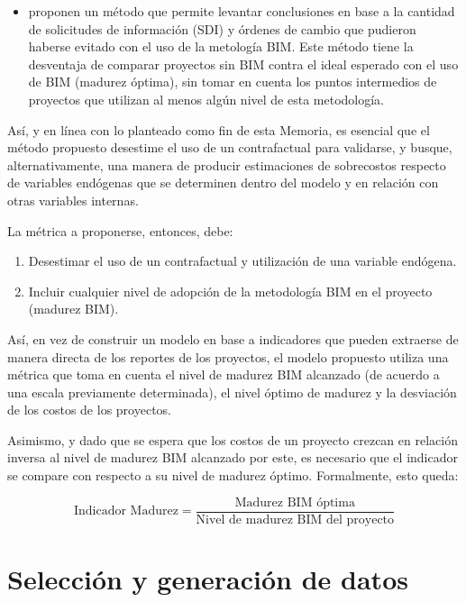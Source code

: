 \begin{itemize}
    \item {} proponen un método que permite levantar conclusiones en base a la cantidad de solicitudes de información (SDI) y órdenes de cambio que pudieron haberse evitado con el uso de la metología BIM. Este método tiene la desventaja de comparar proyectos sin BIM contra el ideal esperado con el uso de BIM (madurez óptima), sin tomar en cuenta los puntos intermedios de proyectos que utilizan al menos algún nivel de esta metodología.
\end{itemize}


Así, y en línea con lo planteado como fin de esta Memoria, es esencial que el método propuesto desestime el uso de un contrafactual para validarse, y busque, alternativamente, una manera de producir estimaciones de sobrecostos respecto de variables endógenas que se determinen dentro del modelo y en relación con otras variables internas.

La métrica a proponerse, entonces, debe:

\begin{enumerate}
    \item Desestimar el uso de un contrafactual y utilización de una variable endógena.
    \item Incluir cualquier nivel de adopción de la metodología BIM en el proyecto (madurez BIM).
\end{enumerate}

Así, en vez de construir un modelo en base a indicadores que pueden extraerse de manera directa de los reportes de los proyectos, el modelo propuesto utiliza una métrica que toma en cuenta el nivel de madurez BIM alcanzado (de acuerdo a una escala previamente determinada), el nivel óptimo de madurez y la desviación de los costos de los proyectos.

Asimismo, y dado que se espera que los costos de un proyecto crezcan en relación inversa al nivel de madurez BIM alcanzado por este, es necesario que el indicador se compare con respecto a su nivel de madurez óptimo. Formalmente, esto queda:

\begin{equation}
    \text{Indicador Madurez} = \frac{\text{Madurez BIM óptima}}{\text{Nivel de madurez BIM del proyecto}}
    \label{eq:indicador-propuesto}
\end{equation}

\section{Selección y generación de datos}

